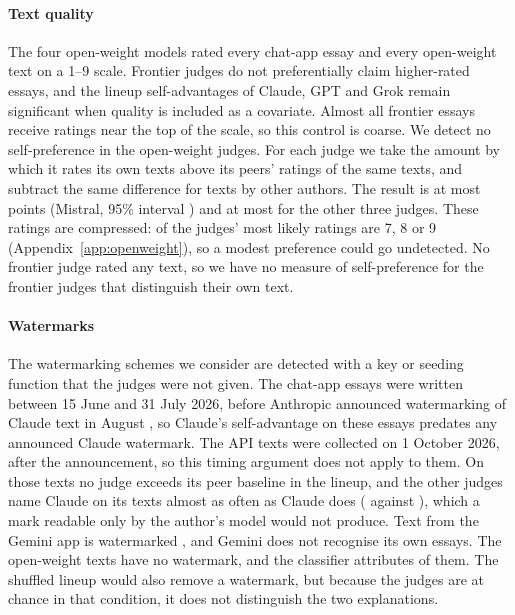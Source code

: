 \paragraph{Text quality}
The four open-weight models rated every chat-app essay and every open-weight
text on a 1--9 scale. Frontier judges do not preferentially claim higher-rated
essays, and the lineup self-advantages of Claude, GPT and Grok remain
significant when quality is included as a covariate. Almost all frontier essays
receive ratings near the top of the scale, so this control is coarse. We
detect no self-preference in the open-weight judges. For each judge we take
the amount by which it rates its own texts above its peers' ratings of the
same texts, and subtract the same difference for texts by other authors. The result
is at most \OWQualSelfPrefMax{} points (Mistral, 95\% interval
\OWMistralQualSelfPrefCI{}) and at most \OWQwenQualSelfPref{} for the other
three judges. These ratings are compressed: \CXQualModalTop{} of the judges'
most likely ratings are 7, 8 or 9
(Appendix~\ref{app:openweight}), so a modest preference
could go undetected. No frontier judge rated any text, so we have no measure of
self-preference for the frontier judges that distinguish their own text.

\paragraph{Watermarks}
The watermarking schemes we consider
\citep{kirchenbauer2023watermark, dathathri2024synthid} are detected with a
key or seeding function that the judges were not given. The chat-app essays
were written between 15 June and 31 July 2026, before Anthropic announced
watermarking of Claude text in August
\citep{anthropic2026watermark, anthropic2026marking}, so Claude's
self-advantage on these essays predates any announced Claude watermark. The
API texts were collected on 1 October 2026, after the announcement, so this
timing argument does not apply to them. On those texts no judge exceeds its
peer baseline in the lineup, and the other judges name Claude on its texts
almost as often as Claude does (\FXClaudeLineupPeer{} against
\FXClaudeLineupSelf{}), which a mark readable only by the author's model would
not produce. Text from the Gemini app is watermarked
\citep{deepmind2026synthid}, and Gemini does not recognise its own essays. The open-weight texts have no watermark, and the classifier attributes
\OWClfPooled{} of them. The shuffled lineup would also remove a watermark, but
because the judges are at chance in that condition, it does not distinguish
the two explanations.


